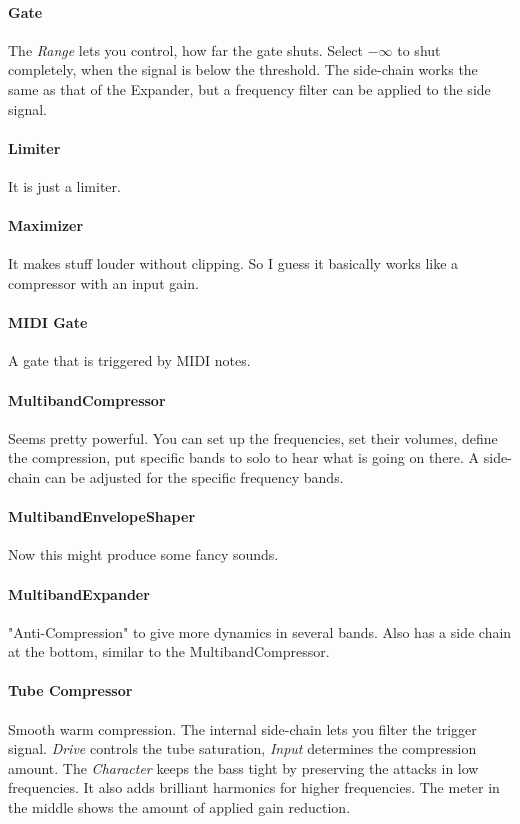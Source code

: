 \documentclass[10pt]{article}
\begin{document}
\paragraph{Gate} The \textit{Range} lets you control, how far the gate shuts. Select $-\infty$ to shut completely, when the signal is below the threshold. The side-chain works the same as that of the Expander, but a frequency filter can be applied to the side signal.

\paragraph{Limiter} It is just a limiter.

\paragraph{Maximizer} It makes stuff louder without clipping. So I guess it basically works like a compressor with an input gain.

\paragraph{MIDI Gate} A gate that is triggered by MIDI notes.

\paragraph{MultibandCompressor} Seems pretty powerful. You can set up the frequencies, set their volumes, define the compression, put specific bands to solo to hear what is going on there. A side-chain can be adjusted for the specific frequency bands.

\paragraph{MultibandEnvelopeShaper} Now this might produce some fancy sounds.

\paragraph{MultibandExpander} "Anti-Compression" to give more dynamics in several bands. Also has a side chain at the bottom, similar to the MultibandCompressor.

\paragraph{Tube Compressor} Smooth warm compression. The internal side-chain lets you filter the trigger signal. \textit{Drive} controls the tube saturation, \textit{Input} determines the compression amount. The \textit{Character} keeps the bass tight by preserving the attacks in low frequencies. It also adds brilliant harmonics for higher frequencies. The meter in the middle shows the amount of applied gain reduction.
\end{document}
